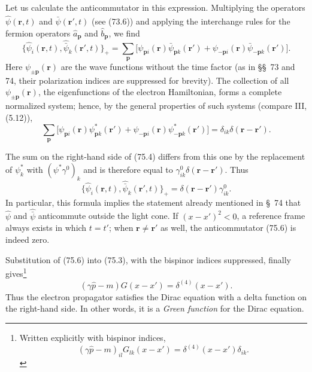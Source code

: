 Let us calculate the anticommutator in this expression. Multiplying the operators $\hat\psi(\mathbf r,t)$ and $\widehat{\bar\psi}(\mathbf r',t)$ (see (73.6)) and applying the interchange rules for the fermion operators $\hat a_{\mathbf p}$ and $\hat b_{\mathbf p}$, we find
\begin{equation}
\{\hat\psi_i(\mathbf r,t),\widehat{\bar\psi}_k(\mathbf r',t)\}_+
=\sum_{\mathbf p}\bigl[\psi_{\mathbf p i}(\mathbf r)\bar\psi_{\mathbf p k}(\mathbf r')
+\psi_{-\mathbf p i}(\mathbf r)\bar\psi_{-\mathbf p k}(\mathbf r')\bigr].
\tag{75.4}
\end{equation}
Here $\psi_{\pm\mathbf p}(\mathbf r)$ are the wave functions without the time factor (as in \S\S~73 and 74, their polarization indices are suppressed for brevity). The collection of all $\psi_{\pm\mathbf p}(\mathbf r)$, the eigenfunctions of the electron Hamiltonian, forms a complete normalized system; hence, by the general properties of such systems (compare III, (5.12)),
\begin{equation}
\sum_{\mathbf p}\bigl[\psi_{\mathbf p i}(\mathbf r)\psi^*_{\mathbf p k}(\mathbf r')
+\psi_{-\mathbf p i}(\mathbf r)\psi^*_{-\mathbf p k}(\mathbf r')\bigr]
=\delta_{ik}\delta(\mathbf r-\mathbf r').
\tag{75.5}
\end{equation}

The sum on the right-hand side of (75.4) differs from this one by the replacement of $\psi_k^*$ with $(\psi^*\gamma^0)_k$ and is therefore equal to $\gamma^0_{ik}\delta(\mathbf r-\mathbf r')$. Thus
\begin{equation}
\{\hat\psi_i(\mathbf r,t),\widehat{\bar\psi}_k(\mathbf r',t)\}_+
=\delta(\mathbf r-\mathbf r')\gamma^0_{ik}.
\tag{75.6}
\end{equation}
In particular, this formula implies the statement already mentioned in \S~74 that $\hat\psi$ and $\widehat{\bar\psi}$ anticommute outside the light cone. If $(x-x')^2<0$, a reference frame always exists in which $t=t'$; when $\mathbf r\ne\mathbf r'$ as well, the anticommutator (75.6) is indeed zero.

Substitution of (75.6) into (75.3), with the bispinor indices suppressed, finally gives\footnote{Written explicitly with bispinor indices,
\[
(\gamma\hat p-m)_{il}G_{lk}(x-x')=\delta^{(4)}(x-x')\delta_{ik}.
\tag{75.7a}
\]}
\begin{equation}
(\gamma\hat p-m)G(x-x')=\delta^{(4)}(x-x').
\tag{75.7}
\end{equation}
Thus the electron propagator satisfies the Dirac equation with a delta function on the right-hand side. In other words, it is a \emph{Green function} for the Dirac equation.


